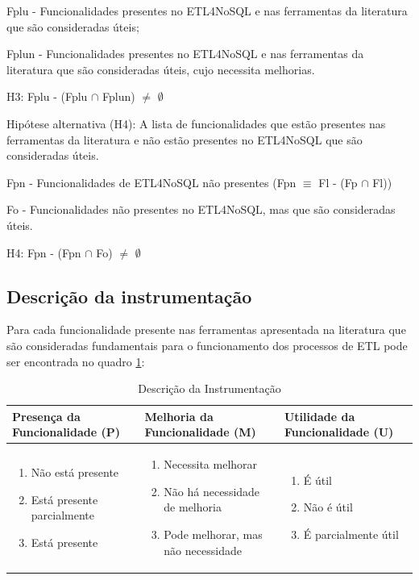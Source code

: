 Fplu - Funcionalidades presentes no ETL4NoSQL e nas ferramentas da literatura que são consideradas úteis;

Fplun - Funcionalidades presentes no ETL4NoSQL e nas ferramentas da literatura que são consideradas úteis, cujo necessita melhorias.

H3: Fplu - (Fplu $\cap$ Fplun)  $\neq$ $\emptyset$
\newline

Hipótese alternativa (H4): A lista de funcionalidades que estão presentes nas ferramentas da literatura e não estão presentes no ETL4NoSQL que são consideradas úteis.

Fpn - Funcionalidades de ETL4NoSQL não presentes (Fpn $\equiv$  Fl - (Fp $\cap$ Fl))

Fo - Funcionalidades não presentes no ETL4NoSQL, mas que são consideradas úteis.

H4: Fpn - (Fpn $\cap$ Fo) $\neq$ $\emptyset$

\subsection{Descrição da instrumentação}

Para cada funcionalidade presente nas ferramentas apresentada na literatura que são consideradas fundamentais para o funcionamento dos processos de ETL pode ser encontrada no quadro \ref{instrumentacao}:

\begin{table}[ht]
	\centering
	\caption{Descrição da Instrumentação}
	\label{instrumentacao}
	\begin{tabular}{|p{5cm}| p{5cm} | p{5cm}|}
		\hline
		Presença da Funcionalidade (P) & Melhoria da Funcionalidade (M) & Utilidade da Funcionalidade (U)\\
		\hline
		\begin{enumerate}
			\item Não está presente
			\item Está presente parcialmente
			\item Está presente
		\end{enumerate} & 
		\begin{enumerate}
			\item Necessita melhorar
			\item Não há necessidade de melhoria
			\item Pode melhorar, mas não necessidade
		\end{enumerate} &
		\begin{enumerate}
			\item É útil
			\item Não é útil
			\item É parcialmente útil
		\end{enumerate}\\
		\hline
		
	\end{tabular}
\end{table}

